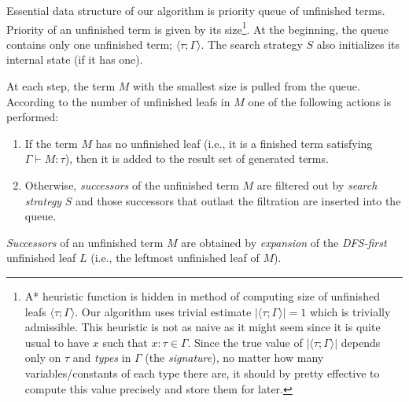 \documentclass[conference]{IEEEtran}
\newcommand{\tur}[3]{#1\vdash{}#2 \colon #3}
\newcommand{\ul}[2]{\langle #1 ; #2 \rangle}
\newcommand{\red}[1]{{\color{red} #1}}
\begin{document}
Essential data structure of our algorithm 
is priority queue of unfinished terms. 
Priority of an unfinished term is given by its size\footnote{
A* heuristic function is hidden in method of computing
size of unfinished leafs $\ul{\tau}{\Gamma}$. Our algorithm uses
trivial estimate $\vert\ul{\tau}{\Gamma}\vert = 1$ which is trivially admissible.
This heuristic is not as naive as it might seem since it is
quite usual to have $x$ such that $x : \tau \in \Gamma$.
Since the true value of $\vert\ul{\tau}{\Gamma}\vert$ depends only on
$\tau$ and \textit{types} in $\Gamma$ (the \textit{signature}), 
no matter how many variables/constants of
each type there are, it should by pretty effective to compute this
value precisely and store them for later. 
}.
At the beginning, the queue contains only one unfinished term; 
$\ul{\tau}{\Gamma}$. The search strategy $S$ also 
initializes its internal state (if it has one).

At each step, the term $M$ with the smallest size
is pulled from the queue.
According to the number of unfinished leafs in $M$ one of
the following actions is performed:
\begin{enumerate}
 \item If the term $M$ has no unfinished leaf (i.e., it is a finished
 term satisfying \mbox{$\tur{\Gamma}{M}{\tau}$}), then it is added to the
 result set
 of generated terms.   
 \item Otherwise, \textit{successors} of the unfinished term $M$ are
       filtered out by \textit{search strategy} $S$ and
       those successors that outlast the filtration 
       are inserted into the queue.
\end{enumerate}

\textit{Successors} of an unfinished term $M$ are obtained by 
\textit{expansion} of the \mbox{\textit{DFS-first}} unfinished leaf $L$
(i.e., the leftmost unfinished leaf of $M$).
\end{document}
